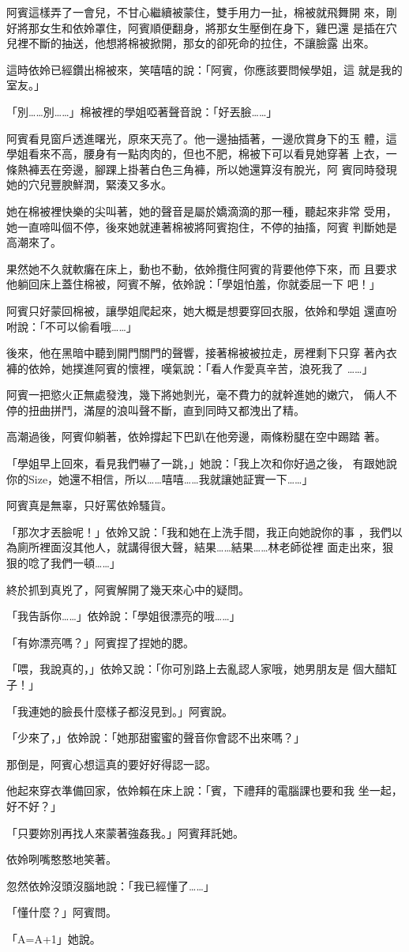 阿賓這樣弄了一會兒，不甘心繼續被蒙住，雙手用力一扯，棉被就飛舞開
來，剛好將那女生和依姈罩住，阿賓順便翻身，將那女生壓倒在身下，雞巴還
是插在穴兒裡不斷的抽送，他想將棉被掀開，那女的卻死命的拉住，不讓臉露
出來。

這時依姈已經鑽出棉被來，笑嘻嘻的說：「阿賓，你應該要問候學姐，這
就是我的室友。」

「別……別……」棉被裡的學姐啞著聲音說：「好丟臉……」

阿賓看見窗戶透進曙光，原來天亮了。他一邊抽插著，一邊欣賞身下的玉
體，這學姐看來不高，腰身有一點肉肉的，但也不肥，棉被下可以看見她穿著
上衣，一條熱褲丟在旁邊，腳踝上掛著白色三角褲，所以她還算沒有脫光，阿
賓同時發現她的穴兒豐腴鮮潤，緊湊又多水。

她在棉被裡快樂的尖叫著，她的聲音是屬於嬌滴滴的那一種，聽起來非常
受用，她一直啼叫個不停，後來她就連著棉被將阿賓抱住，不停的抽搐，阿賓
判斷她是高潮來了。

果然她不久就軟癱在床上，動也不動，依姈攬住阿賓的背要他停下來，而
且要求他躺回床上蓋住棉被，阿賓不解，依姈說：「學姐怕羞，你就委屈一下
吧！」

阿賓只好蒙回棉被，讓學姐爬起來，她大概是想要穿回衣服，依姈和學姐
還直吩咐說：「不可以偷看哦……」

後來，他在黑暗中聽到開門關門的聲響，接著棉被被拉走，房裡剩下只穿
著內衣褲的依姈，她撲進阿賓的懷裡，嘆氣說：「看人作愛真辛苦，浪死我了
……」

阿賓一把慾火正無處發洩，幾下將她剝光，毫不費力的就幹進她的嫩穴，
倆人不停的扭曲拼鬥，滿屋的浪叫聲不斷，直到同時又都洩出了精。

高潮過後，阿賓仰躺著，依姈撐起下巴趴在他旁邊，兩條粉腿在空中踢踏
著。

「學姐早上回來，看見我們嚇了一跳，」她說：「我上次和你好過之後，
有跟她說你的Size，她還不相信，所以……嘻嘻……我就讓她証實一下……」

阿賓真是無辜，只好罵依姈騷貨。

「那次才丟臉呢！」依姈又說：「我和她在上洗手間，我正向她說你的事
，我們以為廁所裡面沒其他人，就講得很大聲，結果……結果……林老師從裡
面走出來，狠狠的唸了我們一頓……」

終於抓到真兇了，阿賓解開了幾天來心中的疑問。

「我告訴你……」依姈說：「學姐很漂亮的哦……」

「有妳漂亮嗎？」阿賓捏了捏她的腮。

「喂，我說真的，」依姈又說：「你可別路上去亂認人家哦，她男朋友是
個大醋缸子！」

「我連她的臉長什麼樣子都沒見到。」阿賓說。

「少來了，」依姈說：「她那甜蜜蜜的聲音你會認不出來嗎？」

那倒是，阿賓心想這真的要好好得認一認。

他起來穿衣準備回家，依姈賴在床上說：「賓，下禮拜的電腦課也要和我
坐一起，好不好？」

「只要妳別再找人來蒙著強姦我。」阿賓拜託她。

依姈咧嘴憨憨地笑著。

忽然依姈沒頭沒腦地說：「我已經懂了……」

「懂什麼？」阿賓問。

「A=A+1」她說。










